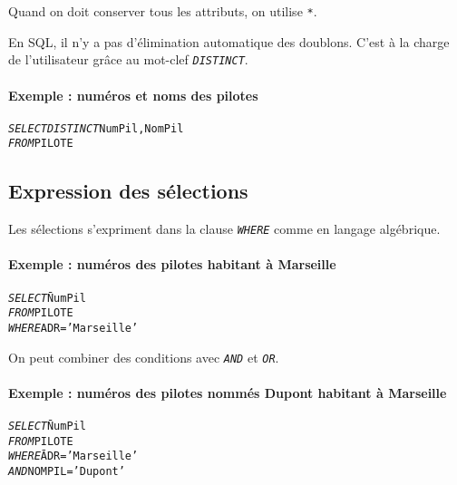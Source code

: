 \documentclass[10pt]{article}
\begin{document}
			Quand on doit conserver tous les attributs, on utilise \texttt{*}.
			
			En SQL, il n'y a pas d'élimination automatique des doublons. C'est à la charge de l'utilisateur grâce au mot-clef \emph{\texttt{DISTINCT}}.
			\paragraph{Exemple : numéros et noms des pilotes}
				\begin{alltt}
					\begin{tabbing}
						\emph{SELECT} \= \emph{DISTINCT} NumPil, NomPil\\
						\emph{FROM} \> PILOTE
					\end{tabbing}
				\end{alltt}
				
		\subsection{Expression des sélections}
			Les sélections s'expriment dans la clause \emph{\texttt{WHERE}} comme en langage algébrique.\index{WHERE}
			\paragraph{Exemple : numéros des pilotes habitant à Marseille}
				\begin{alltt}
					\begin{tabbing}
						\emph{SELECT} \= NumPil\\
						\emph{FROM} \> PILOTE\\
						\emph{WHERE} \> ADR='Marseille'
					\end{tabbing}
				\end{alltt}
				
			On peut combiner des conditions avec \emph{\texttt{AND}} et \emph{\texttt{OR}}.\index{OR}
			\paragraph{Exemple : numéros des pilotes nommés Dupont habitant à Marseille}
				\begin{alltt}
					\begin{tabbing}
						\emph{SELECT} \= NumPil\\
						\emph{FROM} \> PILOTE\\
						\emph{WHERE} \> \= ADR='Marseille'\\
									 \> \> \emph{AND} NOMPIL='Dupont'
					\end{tabbing}
				\end{alltt}
				
\end{document}
